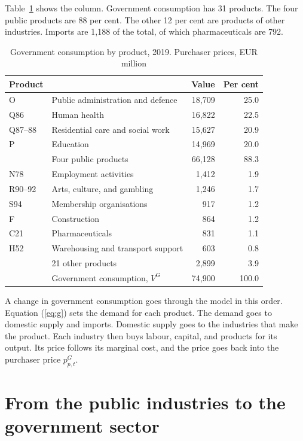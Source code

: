 \documentclass[11pt,a4paper]{article}
\begin{document}
Table~\ref{tab:g} shows the column. Government consumption has 31 products.
The four public products are 88 per cent. The other 12 per cent are products of other industries.
Imports are 1,188 of the total, of which pharmaceuticals are 792.

\begin{table}[!htbp]
\centering
\small
\caption{Government consumption by product, 2019. Purchaser prices, EUR million}
\label{tab:g}
\begin{tabular}{@{}llrr@{}}
\toprule
Product & & Value & Per cent \\
\midrule
O & Public administration and defence & 18,709 & 25.0 \\
Q86 & Human health & 16,822 & 22.5 \\
Q87--88 & Residential care and social work & 15,627 & 20.9 \\
P & Education & 14,969 & 20.0 \\
\midrule
 & Four public products & 66,128 & 88.3 \\
\midrule
N78 & Employment activities & 1,412 & 1.9 \\
R90--92 & Arts, culture, and gambling & 1,246 & 1.7 \\
S94 & Membership organisations & 917 & 1.2 \\
F & Construction & 864 & 1.2 \\
C21 & Pharmaceuticals & 831 & 1.1 \\
H52 & Warehousing and transport support & 603 & 0.8 \\
 & 21 other products & 2,899 & 3.9 \\
\midrule
 & Government consumption, $V^G$ & 74,900 & 100.0 \\
\bottomrule
\end{tabular}
\end{table}

A change in government consumption goes through the model in this order.
Equation (\ref{eq:g}) sets the demand for each product. The demand goes to domestic supply and imports.
Domestic supply goes to the industries that make the product. Each industry then buys labour, capital, and products for its output.
Its price follows its marginal cost, and the price goes back into the purchaser price $p^G_{p,t}$.

\section{From the public industries to the government sector}
\label{sec:link}
\end{document}
